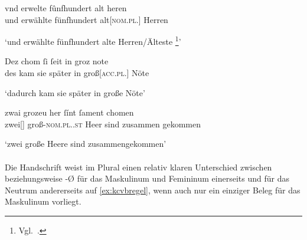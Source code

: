 \begin{exe}
\ex \label{ex:kcb1regel}
	\begin{xlist}
	\ex \label{ex:kcb1regel_1}
		\gll vnd erwelte fûnfhundert alt heren \\
			und erwählte fünfhundert alt[\textsc{nom.pl.\MascM}] Herren \\
		\begin{taggedline}{\parencites[\pno~23\vb, 23]{kc:B1}[vgl.][8477]{schroeder1895}}
		\trans `und erwählte fünfhundert alte Herren/Älteste%
			\footnote{Vgl.~\citet[\pno~\textit{althêrre}]{mwb1}.}'
		\end{taggedline}

	\ex \label{ex:kcb1regel_2}
		\gll Dez chom ſi ſeit in groz note \\
			des kam sie später in groß[\textsc{acc.pl.\FemI}] Nöte \\
		\begin{taggedline}{\parencites[\pno~31\vb, 15]{kc:B1}[vgl.][11413]{schroeder1895}}
		\trans `dadurch kam sie später in große Nöte'
		\end{taggedline}

	\ex \label{ex:kcb1regel_3}
		\gll zwai grozeu her ſínt ſament chomen \\
			zwei[\NeutI] groß-\textsc{nom.pl.\NeutI.st} Heer sind zusammen
				gekommen \\
		\begin{taggedline}{\parencites[\pno~11\rc, 2]{kc:B1}[zu][3535]{schroeder1895}}
		\trans `zwei große Heere sind zusammengekommen'
		\end{taggedline}
	\end{xlist}
\end{exe}

\paragraph{\citet{kc:VB}}
\label{par:adjvb}
Die Handschrift \citet{kc:VB} weist im Plural einen relativ klaren Unterschied
zwischen  beziehungsweise -Ø für das Maskulinum und Femininum
einerseits und  für das Neutrum andererseits auf \cref{ex:kcvbregel},
wenn auch nur ein einziger Beleg für das Maskulinum vorliegt.

